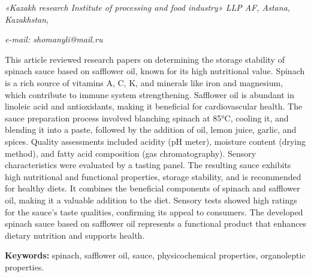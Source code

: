 \begin{affiliation}
\emph{«Kazakh research Institute of processing and food industry» LLP AF, Astana, Kazakhstan,}

\emph{e-mail: shomanyli@mail.ru}
\end{affiliation}

This article reviewed research papers on determining the storage
stability of spinach sauce based on safflower oil, known for its high
nutritional value. Spinach is a rich source of vitamins A, C, K, and
minerals like iron and magnesium, which contribute to immune system
strengthening. Safflower oil is abundant in linoleic acid and
antioxidants, making it beneficial for cardiovascular health. The sauce
preparation process involved blanching spinach at 85°C, cooling it, and
blending it into a paste, followed by the addition of oil, lemon juice,
garlic, and spices. Quality assessments included acidity (pH meter),
moisture content (drying method), and fatty acid composition (gas
chromatography). Sensory characteristics were evaluated by a tasting
panel. The resulting sauce exhibits high nutritional and functional
properties, storage stability, and is recommended for healthy diets. It
combines the beneficial components of spinach and safflower oil, making
it a valuable addition to the diet. Sensory tests showed high ratings
for the sauce's taste qualities, confirming its appeal to consumers. The
developed spinach sauce based on safflower oil represents a functional
product that enhances dietary nutrition and supports health.

{\bfseries Keywords:} spinach, safflower oil, sauce, physicochemical
properties, organoleptic properties.

